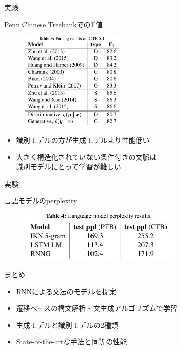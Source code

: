 \documentclass[aspectratio=43,unicode,10pt]{beamer}
\begin{document}
\begin{frame}{実験}
  \begin{block}{Penn Chinese TreebankでのF値}
    \begin{figure}
      \includegraphics[width=0.45\textwidth]{fig/tab_3.png}
    \end{figure}
    \vspace{-1em}
    \begin{itemize}
      \item 識別モデルの方が生成モデルより性能低い
      \item 大きく構造化されていない条件付きの文脈は \\
            識別モデルにとって学習が難しい
    \end{itemize}
  \end{block}
\end{frame}

\begin{frame}{実験}
  \begin{block}{言語モデルのperplexity}
    \begin{figure}
      \includegraphics[width=0.7\textwidth]{fig/tab_4.png}
    \end{figure}
  \end{block}
\end{frame}

\begin{frame}{まとめ}
  \begin{itemize}
    \item RNNによる文法のモデルを提案
    \item 遷移ベースの構文解析・文生成アルゴリズムで学習
    \item 生成モデルと識別モデルの2種類
    \item State-of-the-artな手法と同等の性能
  \end{itemize}
\end{frame}
\end{document}
